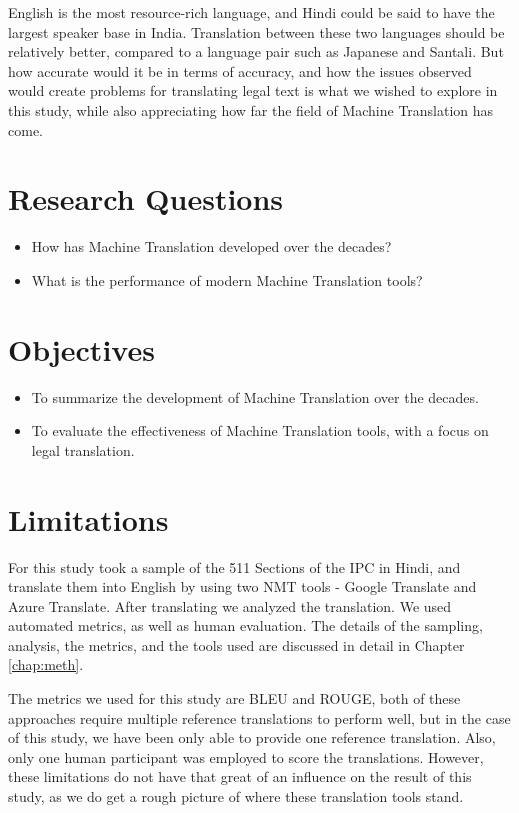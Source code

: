 English is the most resource-rich language, and Hindi could be said to have the largest speaker base in India. Translation between these two languages should be relatively better, compared to a language pair such as Japanese and Santali. But how accurate would it be in terms of accuracy, and how the issues observed would create problems for translating legal text is what we wished to explore in this study, while also appreciating how far the field of Machine Translation has come.

\section{Research Questions}

\begin{itemize}
    \item How has Machine Translation developed over the decades?
    \item What is the performance of modern Machine Translation tools?
\end{itemize}

\section{Objectives}

\begin{itemize}
    \item To summarize the development of Machine Translation over the decades.
    \item To evaluate the effectiveness of Machine Translation tools, with a focus on legal translation.
\end{itemize}

\section{Limitations}

For this study took a sample of the 511 Sections of the IPC in Hindi, and translate them into English by using two NMT tools - Google Translate and Azure Translate. After translating we analyzed the translation. We used automated metrics, as well as human evaluation. The details of the sampling, analysis, the metrics, and the tools used are discussed in detail in Chapter \ref{chap:meth}.

The metrics we used for this study are BLEU and ROUGE, both of these approaches require multiple reference translations to perform well, but in the case of this study, we have been only able to provide one reference translation. Also, only one human participant was employed to score the translations. However, these limitations do not have that great of an influence on the result of this study, as we do get a rough picture of where these translation tools stand.